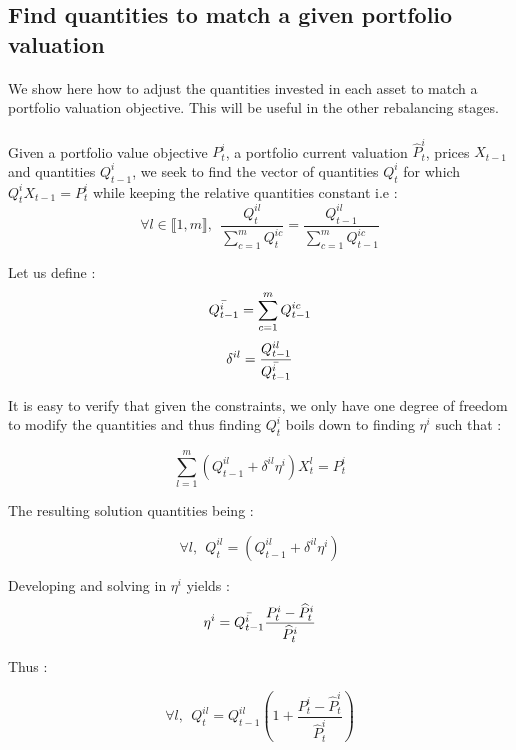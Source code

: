 \documentclass{article}
\begin{document}
\begin{appendices}

\section{Find quantities to match a given portfolio valuation}\label{matching_quantities}
\paragraph{}
We show here how to adjust the quantities invested in each asset to match a portfolio valuation objective. This will be useful in the other rebalancing stages.

\paragraph{}
Given a portfolio value objective $P_t^{i}$, a portfolio current valuation $\widehat {P}_t^{i}$, prices $X_{t-1}$ and quantities $Q_{t-1}^i$, we seek to find the vector of quantities $Q_t^{i}$ for which $Q_t^{i}X_{t-1} = P_t^{i}$ while keeping the relative quantities constant i.e : 
$$\forall l \in \llbracket 1, m \rrbracket,~~ \frac{Q_t^{il}}{\sum_{c=1}^m Q_t^{ic}} = \frac{Q_{t-1}^{il}}{\sum_{c=1}^m Q_{t-1}^{ic}}$$

Let us define : $$\Bar{Q_{t-1}^i} = \sum_{c=1}^m Q_{t-1}^{ic}$$
$$\delta^{il} = \frac{Q_{t-1}^{il}}{\Bar{Q_{t-1}^i}}$$


It is easy to verify that given the constraints, we only have one degree of freedom to modify the quantities and thus finding $Q_t^{i}$ boils down to finding $\eta^i$ such that : 

$$\sum_{l=1}^m (Q_{t-1}^{il} + \delta^{il}\eta^i)X_t^l = P_t^{i}$$

The resulting solution quantities being :

$$\forall l,~~ Q_t^{il} =  (Q_{t-1}^{il} + \delta^{il}\eta^i) $$

Developing and solving in $\eta^i$ yields : 
$$ \eta^i = \Bar{Q_{t-1}^i} \frac{P_t^{i} - \widehat{P}_t^i}{\widehat{P}_t^i}$$

Thus : 

\begin{equation*}
\forall l,~~ Q_t^{il} = Q_{t-1}^{il}\left(1 + \frac{P_t^{i} - \widehat{P}_t^i}{\widehat{P}_t^i} \right)
\end{equation*}


\end{appendices}


\printbibliography
\end{document}
